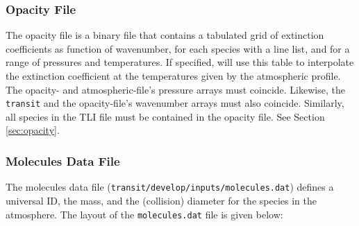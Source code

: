 \documentclass[letterpaper, 12pt]{article}
\begin{document}
\subsubsection{Opacity File}
\label{sec:opac-file}

The opacity file is a binary file that contains a tabulated grid of
extinction coefficients as function of wavenumber, for each species
with a line list, and for a range of pressures and temperatures.  If
specified, {\transit} will use this table to interpolate the
extinction coefficient at the temperatures given by the atmospheric
profile.  The opacity- and atmospheric-file's pressure arrays must
coincide.  Likewise, the {\tt transit} and the opacity-file's
wavenumber arrays must also coincide.  Similarly, all species in the
TLI file must be contained in the opacity file.  See Section
\ref{sec:opacity}.


\subsubsection{Molecules Data File}

The molecules data file ({\tt transit/develop/inputs/molecules.dat})
defines a universal ID, the mass, and the (collision) diameter for the
species in the atmosphere.
The layout of the {\tt molecules.dat} file is given below: \newline
\end{document}
